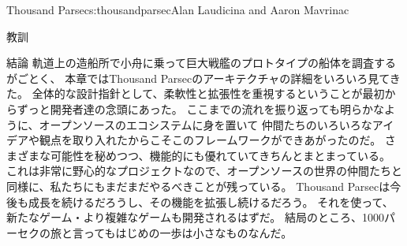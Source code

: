 \begin{aosachapter}{Thousand Parsec}{s:thousandparsec}{Alan Laudicina and Aaron Mavrinac}
\begin{aosasect1}{教訓}
\begin{aosasect2}{結論}
軌道上の造船所で小舟に乗って巨大戦艦のプロトタイプの船体を調査するがごとく、
本章ではThousand Parsecのアーキテクチャの詳細をいろいろ見てきた。
全体的な設計指針として、柔軟性と拡張性を重視するということが最初からずっと開発者達の念頭にあった。
ここまでの流れを振り返っても明らかなように、オープンソースのエコシステムに身を置いて
仲間たちのいろいろなアイデアや観点を取り入れたからこそこのフレームワークができあがったのだ。
さまざまな可能性を秘めつつ、機能的にも優れていてきちんとまとまっている。
これは非常に野心的なプロジェクトなので、オープンソースの世界の仲間たちと同様に、私たちにもまだまだやるべきことが残っている。
Thousand Parsecは今後も成長を続けるだろうし、その機能を拡張し続けるだろう。
それを使って、新たなゲーム・より複雑なゲームも開発されるはずだ。
結局のところ、1000パーセクの旅と言ってもはじめの一歩は小さなものなんだ。

\end{aosasect2}

\end{aosasect1}

\end{aosachapter}
